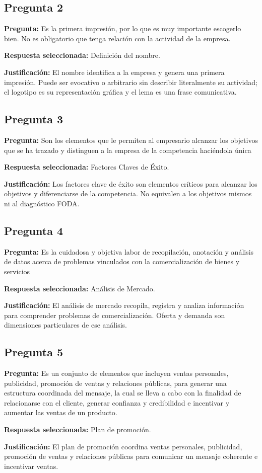 {\subsection{Pregunta 2}
\textbf{Pregunta:} Es la primera impresión, por lo que es muy importante escogerlo bien. No es obligatorio que tenga relación con la actividad de la empresa.
\par\textbf{Respuesta seleccionada:} Definición del nombre.
\par\textbf{Justificación:} El nombre identifica a la empresa y genera una primera impresión. Puede ser evocativo o arbitrario sin describir literalmente su actividad; el logotipo es su representación gráfica y el lema es una frase comunicativa.
\subsection{Pregunta 3}
\textbf{Pregunta:} Son los elementos que le permiten al empresario alcanzar los objetivos que se ha trazado y distinguen a la empresa de la competencia haciéndola única
\par\textbf{Respuesta seleccionada:} Factores Claves de Éxito.
\par\textbf{Justificación:} Los factores clave de éxito son elementos críticos para alcanzar los objetivos y diferenciarse de la competencia. No equivalen a los objetivos mismos ni al diagnóstico FODA.
\subsection{Pregunta 4}
\textbf{Pregunta:} Es la cuidadosa y objetiva labor de recopilación, anotación y análisis de datos acerca de problemas vinculados con la comercialización de bienes y servicios
\par\textbf{Respuesta seleccionada:} Análisis de Mercado.
\par\textbf{Justificación:} El análisis de mercado recopila, registra y analiza información para comprender problemas de comercialización. Oferta y demanda son dimensiones particulares de ese análisis.
\subsection{Pregunta 5}
\textbf{Pregunta:} Es un conjunto de elementos que incluyen ventas personales, publicidad, promoción de ventas y relaciones públicas, para generar una estructura coordinada del mensaje, la cual se lleva a cabo con la finalidad de relacionarse con el cliente, generar confianza y credibilidad e incentivar y aumentar las ventas de un producto.
\par\textbf{Respuesta seleccionada:} Plan de promoción.
\par\textbf{Justificación:} El plan de promoción coordina ventas personales, publicidad, promoción de ventas y relaciones públicas para comunicar un mensaje coherente e incentivar ventas.
}
